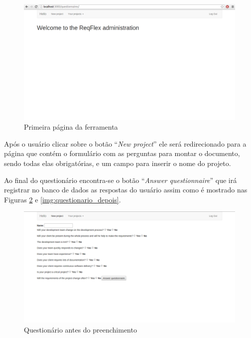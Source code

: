 \begin{figure}[H]
	\centering
	\includegraphics[scale=0.3]{imgFerramenta/primeiraPagina}
	\caption{Primeira página da ferramenta}
	\label{img:primeira_pag_fer}
\end{figure}

Após o usuário clicar sobre o botão ``\textit{New project}'' ele será redirecionado para a página que contém o formulário com as perguntas para montar o documento, sendo todas elas obrigatórias, e um campo para inserir o nome do projeto.

Ao final do questionário encontra-se o botão ``\textit{Answer questionnaire}'' que irá registrar no banco de dados as respostas do usuário assim como é mostrado nas Figuras \ref{img:questionario_antes} e \ref{img:questionario_depois}.

\begin{figure}[H]
	\centering
	\includegraphics[scale=0.3]{imgFerramenta/questionarioBranco}
	\caption{Questionário antes do preenchimento}
	\label{img:questionario_antes}
\end{figure}

